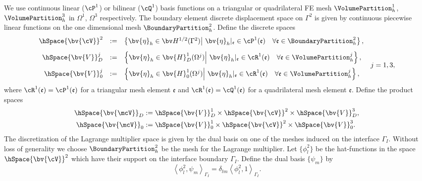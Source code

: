 We use continuous linear ($\cP^1$) or bilinear ($\cQ^1$) basis functions on a triangular or quadrilateral FE mesh $\VolumePartition^1_h$, $\VolumePartition^3_h$ in $\Omega^1$, $\Omega^3$ respectively. The boundary element discrete displacement space on $\Gamma^2$ is given by continuous piecewise linear functions on the one dimensional mesh $\BoundaryPartition^2_h$.
Define the discrete spaces
\begin{equation*}
\begin{array}{rcl}
\hSpace{\bv{\cV}}^2 &:=& \left\lbrace \bv{\eta}_h \in \bv H^{1/2}(\Gamma^2) \middle|~ \bv{\eta}_h|_{\mathfrak{e}} \in \cP^1(\mathfrak{e}) \quad \forall \mathfrak{e} \in \BoundaryPartition^2_h \right\rbrace, \\[2ex]
\hSpace{\bv{V}}^j_D &:=& \left\lbrace \bv{\eta}_h \in \bv{H}^1_D(\Omega^j) \middle|~ \bv{\eta}_h|_{\mathfrak{e}} \in \cR^1(\mathfrak{e}) \quad \forall {\mathfrak{e}} \in \VolumePartition^j_h \right\rbrace, \\[2ex]
\hSpace{\bv{V}}^j_0 &:=& \left\lbrace \bv{\eta}_h \in \bv{H}^1_0(\Omega^j) \middle|~ \bv{\eta}_h|_{\mathfrak{e}} \in \cR^1(\mathfrak{e}) \quad \forall {\mathfrak{e}} \in \VolumePartition^j_h \right\rbrace,
\end{array} 
\begin{array}{c}
{} \\[2ex]
j=1,3,
\end{array}
\end{equation*}
where $\cR^1(\mathfrak{e}) = \cP^1(\mathfrak{e})$ for a triangular mesh element $\mathfrak{e}$ and $\cR^1(\mathfrak{e}) = \cQ^1(\mathfrak{e})$ for a quadrilateral mesh element $\mathfrak{e}$.
Define the product spaces
\begin{align*}
\hSpace{\bv{\mcV}}_D &:= \hSpace{\bv{V}}^1_D \times \hSpace{\bv{\cV}}^2 \times \hSpace{\bv{V}}^3_D, \\
\hSpace{\bv{\mcV}}_0 &:= \hSpace{\bv{V}}^1_0 \times \hSpace{\bv{\cV}}^2 \times \hSpace{\bv{V}}^3_0.
\end{align*}
The discretization of the Lagrange multiplier space is given by the dual basis on one of the meshes induced on the interface $\Gamma_I$. Without loss of generality we choose $\BoundaryPartition^2_h$ be the mesh for the Lagrange multiplier. Let $\{\phi^2_l\}$ be the hat-functions in the space $\hSpace{\bv{\cV}}^2$ which have their support on the interface boundary $\Gamma_I$. Define the dual basis $\{\psi_m\}$ by
\begin{equation} \label{DualBasis}
\left\langle \phi^2_l,\psi_m \right\rangle_{\Gamma_I} 
= \delta_{lm} \left\langle \phi^2_l, 1 \right\rangle_{\Gamma_I}.
\end{equation}
